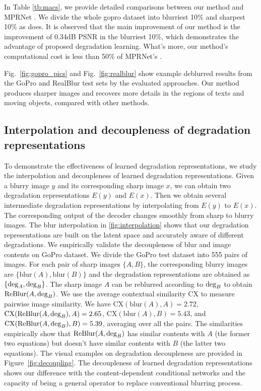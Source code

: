 \documentclass[runningheads]{llncs}
\begin{document}
In Table \ref{tb:macs}, we provide detailed comparisons between our method and MPRNet \cite{Zamir2021MPRNet}. 
We divide the whole gopro dataset into blurriest 10\% and sharpest 10\% as \cite{Son2021PVDNet} does. It is observed that the main improvement of our method is the improvement of 0.34dB PSNR in the blurriest 10\%, which demonstrates the advantage of proposed degradation learning. What's more, our method's computational cost is less than 50\% of MPRNet's \cite{Zamir2021MPRNet}.

Fig.~\ref{fig:gopro_pics} and Fig.~\ref{fig:realblur} show example deblurred results from the GoPro \cite{deblur-multi-scale} and RealBlur \cite{realblur} test sets by the evaluated approaches.
Our method produces sharper images and recovers more details in the regions of texts and moving objects, compared with other methods.

\subsection{Interpolation and decoupleness of degradation representations}

To demonstrate the effectiveness of learned degradation representations, we study the interpolation and decoupleness of learned degradation representations. 
Given a blurry image $y$ and its corresponding sharp image $x$, we can obtain two degradation representations $E(y)$ and $E(x)$.  Then we obtain several intermediate degradation representations by interpolating from $E(y)$ to $E(x)$. The corresponding output of the decoder changes smoothly from sharp to blurry images. 
The blur interpolation in \cref{fig:interpolation} shows that our degradation representations are built on the latent space and accurately aware of different degradations.
We empirically validate the decoupleness of blur and image contents on GoPro dataset. We divide the GoPro test dataset into 555 pairs of images. For each pair of sharp images $\{A,B\}$, the corresponding blurry images are $\{\mathrm{blur}(A),\mathrm{blur}(B)\}$ and the degradation representations are obtained as $\{{\rm deg}_A, {\rm deg}_B\}$. The sharp image $A$ can be reblurred according to ${\rm deg}_B$ to obtain $\mathrm{ReBlur}(A, {\rm deg}_B)$. 
We use the average contextual similarity $\mathrm{CX}$ \cite{contextual} to measure pairwise image similarity. We have $\mathrm{CX}(\mathrm{blur}(A),A)= 2.72$, $\mathrm{CX}(\mathrm{ReBlur}(A,{\rm deg}_B),A)=2.65$, $\mathrm{CX}(\mathrm{blur}(A),B)=5.43$, and $\mathrm{CX}(\mathrm{ReBlur}(A,{\rm deg}_B),B)=5.39$, averaging over all the pairs. The similarities empirically show that  $\mathrm{ReBlur}(A, {\rm deg}_B)$ has similar contents with $A$ (the former two equations) but doesn't have similar contents with $B$ (the latter two equations). The visual examples on degradation decoupleness are provided in Figure~\ref{fig:decoupling}. The decoupleness of learned degradation representations shows our difference with the content-dependent conditional networks \cite{wang2018sftgan,spatially_variant_recurrent,zhou2019stfan} and the capacity of being a general operator to replace conventional blurring process.
\end{document}
